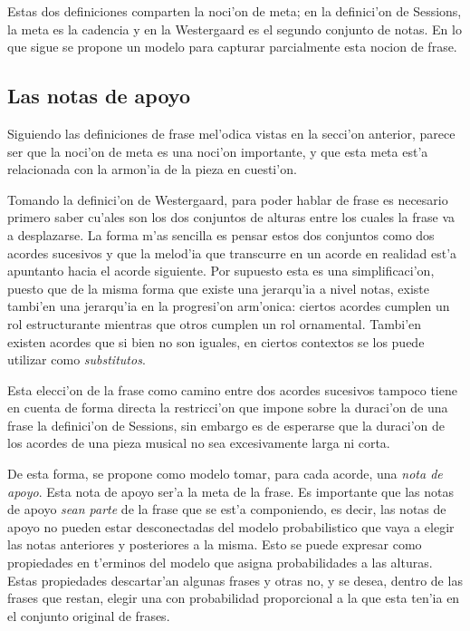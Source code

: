 Estas dos definiciones comparten la noci'on de meta; en la definici'on de Sessions, la meta es la cadencia y en la Westergaard 
es el segundo conjunto de notas.  En lo que sigue se propone un modelo para capturar parcialmente esta nocion de frase.

\subsection{Las notas de apoyo}
Siguiendo las definiciones
de frase mel'odica vistas en la secci'on anterior, parece ser que la noci'on de meta es una noci'on importante, y que esta meta
est'a relacionada con la armon'ia de la pieza en cuesti'on. 

Tomando la definici'on de Westergaard, para poder hablar de frase es necesario primero saber cu'ales son los dos conjuntos de 
alturas entre los cuales la frase va a desplazarse. La forma m'as sencilla es pensar estos dos conjuntos como dos acordes sucesivos
y que la melod'ia que transcurre en un acorde en realidad est'a apuntanto hacia el acorde siguiente. Por supuesto
esta es una simplificaci'on, puesto que de la misma forma que existe una jerarqu'ia a nivel notas, existe tambi'en una jerarqu'ia
en la progresi'on arm'onica: ciertos acordes cumplen un rol estructurante mientras que otros cumplen un rol ornamental. Tambi'en
existen acordes que si bien no son iguales, en ciertos contextos se los puede utilizar como \emph{substitutos}. 

Esta elecci'on de la frase como camino entre dos acordes sucesivos tampoco tiene en cuenta de forma directa la restricci'on 
que impone sobre la duraci'on de una frase la definici'on de Sessions, sin embargo es de esperarse que la duraci'on de los acordes de una pieza musical
no sea excesivamente larga ni corta. 

De esta forma, se propone como modelo tomar, para cada acorde, una \emph{nota de apoyo}. Esta nota de apoyo ser'a la meta de 
la frase. Es importante que las notas de apoyo \emph{sean parte} de la frase que se est'a componiendo, es decir, las notas
de apoyo no pueden estar desconectadas del modelo probabilistico que vaya a elegir las notas anteriores y posteriores a la misma. 
Esto se puede expresar como propiedades en t'erminos del modelo que asigna probabilidades a las alturas. 
Estas propiedades descartar'an algunas frases y otras no, y se desea, dentro de las frases que restan, elegir una con probabilidad
proporcional a la que esta ten'ia en el conjunto original de frases. 

